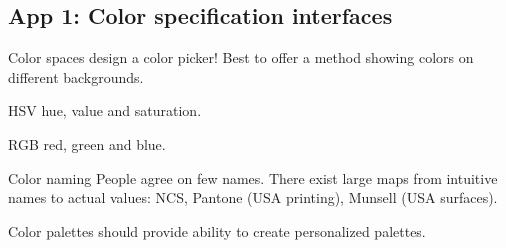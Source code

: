 \begin{mdframed}\begin{multicols}{2}
\subsection{App 1: Color specification interfaces}
\begin{compactdesc}
    \item[Color spaces] design a color picker! Best to offer a method showing
        colors on different backgrounds.
    \item[HSV] hue, value and saturation.
    \item[RGB] red, green and blue.
    \item[Color naming] People agree on few names. There exist large maps
        from intuitive names to actual values: NCS, Pantone (USA printing),
        Munsell (USA surfaces).
    \item[Color palettes] should provide ability to create personalized
        palettes.
\end{compactdesc}
\end{multicols}\end{mdframed}


